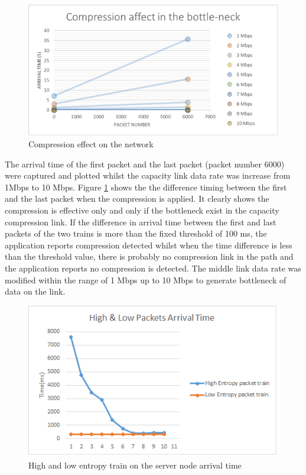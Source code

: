 \documentclass[sigconf]{acmart}
\begin{document}
 \begin{figure}[h]
  \centering
  \includegraphics[width=\linewidth]{2}
  \caption{Compression effect on the network}
  \label{f2}
\end{figure} 


The arrival time of the first packet and the last packet (packet number 6000) were captured and plotted whilst the capacity link data rate was increase from 1Mbps to 10 Mbps. Figure \ref{f2} shows the the difference timing between the first and the last packet when the compression is applied. It clearly shows the compression is effective only and only if the bottleneck exist in the capacity compression link. 
If the difference in arrival time between the first and last packets of the two trains is more than the fixed threshold of 100 ms, the application reports compression detected whilst when the time difference is less than the threshold value, there is probably no compression link in the path and the application reports no compression is detected. The middle link data rate was modified within the range of 1 Mbps up to 10 Mbps to generate bottleneck of data on the link. 

 \begin{figure}[h]
  \centering
  \includegraphics[width=\linewidth]{4}
  \caption{High and low entropy train on the server node arrival time }
  \label{t1}
\end{figure} 
\end{document}
